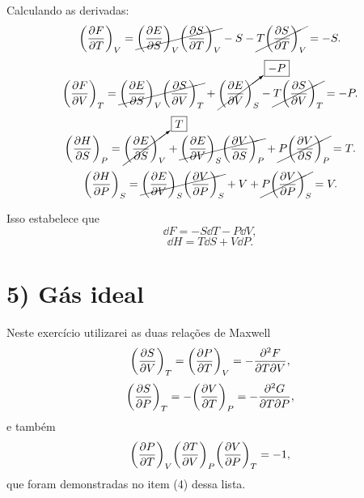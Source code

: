 \documentclass[a4paper,10pt]{article}
\begin{document}
Calculando as derivadas:
$$
\qty(\pdv{F}{T})_{V} = \cancel{\qty(\pdv{E}{S})_V \qty(\pdv{S}{T})_V} - S - \cancel{T \qty(\pdv{S}{T})_V} = - S.
$$
$$
\qty(\pdv{F}{V})_{T} = \cancel{\qty(\pdv{E}{S})_V \qty(\pdv{S}{V})_T} + \cancelto{\boxed{-P}}{\qty(\pdv{E}{V})_S} - \cancel{T \qty(\pdv{S}{V})_T} = -P.
$$
$$
\qty(\pdv{H}{S})_{P} = \cancelto{\boxed{T}}{\qty(\pdv{E}{S})_V} + \cancel{\qty(\pdv{E}{V})_S \qty(\pdv{V}{S})_P} + \cancel{P \qty(\pdv{V}{S})_P} = T.
$$
$$
\qty(\pdv{H}{P})_{S} = \cancel{\qty(\pdv{E}{V})_S \qty(\pdv{V}{P})_S} + V + \cancel{P \qty(\pdv{V}{P})_S} = V.
$$

Isso estabelece que
$$
\boxed{ \dd{F} = -S \dd{T} - P \dd{V}, }
$$
$$
\boxed{ \dd{H} = T \dd{S} + V \dd{P}. }
$$


\pagebreak

\section*{5) Gás ideal}

Neste exercício utilizarei as duas relações de Maxwell
\begin{equation} \label{eq:maxwell_1}
\qty(\pdv{S}{V})_{T} = \qty(\pdv{P}{T})_{V} = - \pdv{F}{T}{V},
\end{equation}
\begin{equation} \label{eq:maxwell_2}
\qty(\pdv{S}{P})_{T} = - \qty(\pdv{V}{T})_{P} = - \pdv{G}{T}{P},
\end{equation}
e também
\begin{equation} \label{eq:ptvp}
\qty(\pdv{P}{T})_{V} \qty(\pdv{T}{V})_{P} \qty(\pdv{V}{P})_{T} = -1,
\end{equation}
que foram demonstradas no item (4) dessa lista.

\n
\end{document}
